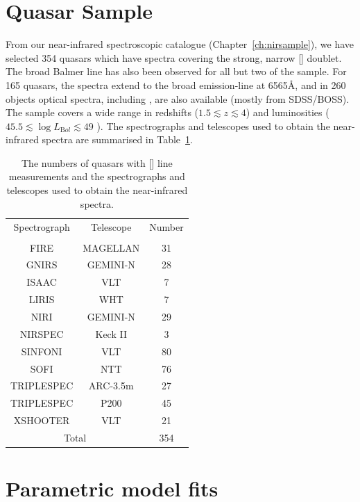 \section{Quasar Sample}

From our near-infrared spectroscopic catalogue (Chapter~\ref{ch:nirsample}), we have selected 354 quasars which have spectra covering the strong, narrow [] doublet. 
The broad Balmer \hb line has also been observed for all but two of the sample. 
For 165 quasars, the spectra extend to the broad \ha emission-line at 6565\AA, and in 260 objects optical spectra, including , are also available (mostly from SDSS/BOSS). 
The sample covers a wide range in redshifts ($1.5 \lesssim z \lesssim 4$) and luminosities ($45.5 \lesssim \log L_{\mathrm Bol} \lesssim 49$ \ergs). 
The spectrographs and telescopes used to obtain the near-infrared spectra are summarised in Table~\ref{tab:specnums_ch4}.

\begin{table}
  \centering
  \footnotesize 
  \caption{The numbers of quasars with [] line measurements and the spectrographs and telescopes used to obtain the near-infrared spectra.}
  \label{tab:specnums_ch4}
    \begin{tabular}{ccc} 
    \hline
    Spectrograph & Telescope & Number \\
                 &           & \\
    \hline
    FIRE         & MAGELLAN  & 31 \\
    GNIRS        & GEMINI-N  & 28 \\
    ISAAC        & VLT       & 7 \\
    LIRIS        & WHT       & 7 \\
    NIRI         & GEMINI-N  & 29 \\
    NIRSPEC      & Keck II   & 3 \\
    SINFONI      & VLT       & 80 \\
    SOFI         & NTT       & 76 \\
    TRIPLESPEC   & ARC-3.5m  & 27 \\
    TRIPLESPEC   & P200      & 45 \\
    XSHOOTER     & VLT       & 21 \\
    \hline
    \multicolumn{2}{c}{Total} & 354 \\
    \hline
    \end{tabular}
\end{table} 

\section{Parametric model fits}


